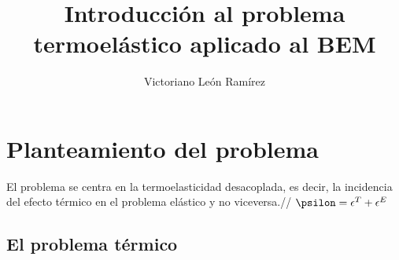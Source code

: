 \documentclass[11pt,a4paper]{article}
\author{Victoriano León Ramírez}
\title{Introducción al problema termoelástico aplicado al BEM}
\begin{document}
\maketitle
\section{Planteamiento del problema}
El problema se centra en la termoelasticidad desacoplada, es decir, la incidencia del efecto térmico en el problema elástico y no viceversa.//
 $\psilon =\epsilon^{T} +\epsilon^{E}$
\subsection{El problema térmico}
\end{document}
